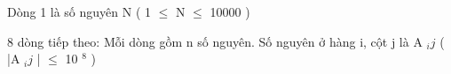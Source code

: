 Dòng 1 là số nguyên N ( 1  $\le$  N  $\le$  10000 )  

   8 dòng tiếp theo: Mỗi dòng gồm n số nguyên. Số nguyên ở hàng i, cột j là A   $_    ij   $   ( |A   $_    ij   $   |  $\le$  10   $^    8   $   )